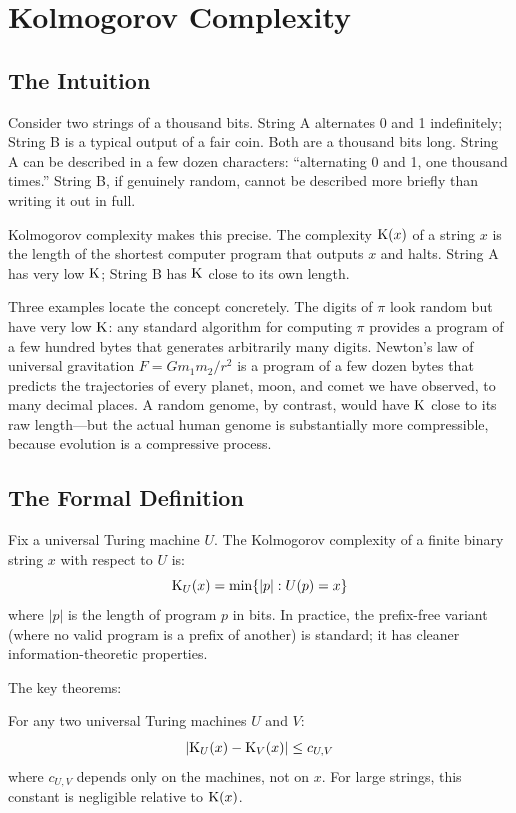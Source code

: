 \section{Kolmogorov Complexity}
\label{sec:kolmogorov}

\subsection{The Intuition}

Consider two strings of a thousand bits. String A alternates 0 and 1
indefinitely; String B is a typical output of a fair coin. Both are a
thousand bits long. String A can be described in a few dozen characters:
``alternating 0 and 1, one thousand times.'' String B, if genuinely random,
cannot be described more briefly than writing it out in full.

Kolmogorov complexity makes this precise. The complexity $\mathrm{K}(x)$ of a string
$x$ is the length of the shortest computer program that outputs $x$ and halts.
String A has very low $\mathrm{K}$; String B has $\mathrm{K}$ close to its own length.

Three examples locate the concept concretely. The digits of $\pi$ look random
but have very low $\mathrm{K}$: any standard algorithm for computing $\pi$ provides a
program of a few hundred bytes that generates arbitrarily many digits.
Newton's law of universal gravitation $F = Gm_1 m_2 / r^2$ is a program of a
few dozen bytes that predicts the trajectories of every planet, moon, and comet
we have observed, to many decimal places. A random genome, by contrast, would
have $\mathrm{K}$ close to its raw length---but the actual human genome is substantially
more compressible, because evolution is a compressive process.

\subsection{The Formal Definition}

Fix a universal Turing machine $U$. The Kolmogorov complexity of a finite
binary string $x$ with respect to $U$ is:
\[
  \mathrm{K}_U(x) = \min\{ |p| : U(p) = x \}
\]
where $|p|$ is the length of program $p$ in bits. In practice, the
prefix-free variant (where no valid program is a prefix of another) is
standard; it has cleaner information-theoretic properties.

The key theorems:

\begin{theorem}
For any two universal Turing machines $U$ and $V$:
\[
  |\mathrm{K}_U(x) - \mathrm{K}_V(x)| \leq c_{U,V}
\]
where $c_{U,V}$ depends only on the machines, not on $x$. For large strings,
this constant is negligible relative to $\mathrm{K}(x)$.
\end{theorem}


